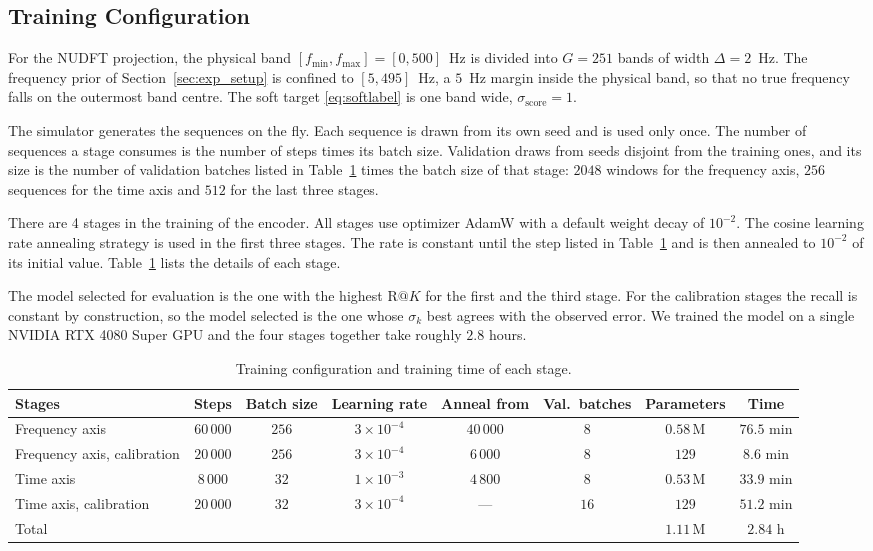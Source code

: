 \documentclass[journal,onecolumn]{IEEEtran}
\begin{document}
\subsection{Training Configuration}
\label{sec:exp_config}

For the NUDFT projection, the physical band $[f_{\min},f_{\max}]=[0,500]$~Hz is divided into $G=251$ bands of width $\Delta=2$~Hz. The frequency prior of Section~\ref{sec:exp_setup} is confined to $[5,495]$~Hz, a $5$~Hz margin inside the physical band, so that no true frequency falls on the outermost band centre. The soft target \eqref{eq:softlabel} is one band wide, $\sigma_{\mathrm{score}}=1$.

The simulator generates the sequences on the fly. Each sequence is drawn from its own seed and is used only once. The number of sequences a stage consumes is the number of steps times its batch size. Validation draws from seeds disjoint from the training ones, and its size is the number of validation batches listed in Table~\ref{tab:trainconfig} times the batch size of that stage: $2048$ windows for the frequency axis, $256$ sequences for the time axis and $512$ for the last three stages.

There are 4 stages in the training of the encoder. All stages use optimizer AdamW with a default weight decay of $10^{-2}$. The cosine learning rate annealing strategy is used in the first three stages. The rate is constant until the step listed in Table~\ref{tab:trainconfig} and is then annealed to $10^{-2}$ of its initial value. Table~\ref{tab:trainconfig} lists the details of each stage. 

The model selected for evaluation is the one with the highest $\mathrm{R}@K$ for the first and the third stage. For the calibration stages the recall is constant by construction, so the model selected is the one whose $\sigma_k$ best agrees with the observed error. We trained the model on a single NVIDIA RTX 4080 Super GPU and the four stages together take roughly $2.8$ hours. 

\begin{table}[t]
\caption{Training configuration and training time of each stage.}
\label{tab:trainconfig}
\centering
\begin{tabular}{lccccccc}
\hline
Stages & Steps & Batch size & Learning rate & Anneal from & Val.\ batches & Parameters & Time \\
\hline
Frequency axis & $60\,000$ & $256$ & $3\times10^{-4}$ & $40\,000$ & $8$ & $0.58$\,M & $76.5$ min \\
Frequency axis, calibration & $20\,000$ & $256$ & $3\times10^{-4}$ & $6\,000$ & $8$ & $129$ & $8.6$ min \\
Time axis & $8\,000$ & $32$ & $1\times10^{-3}$ & $4\,800$ & $8$ & $0.53$\,M & $33.9$ min \\
Time axis, calibration & $20\,000$ & $32$ & $3\times10^{-4}$ & --- & $16$ & $129$ & $51.2$ min \\
\hline
Total & & & & & & $1.11$\,M & $2.84$ h \\
\hline
\end{tabular}
\end{table}
\end{document}
